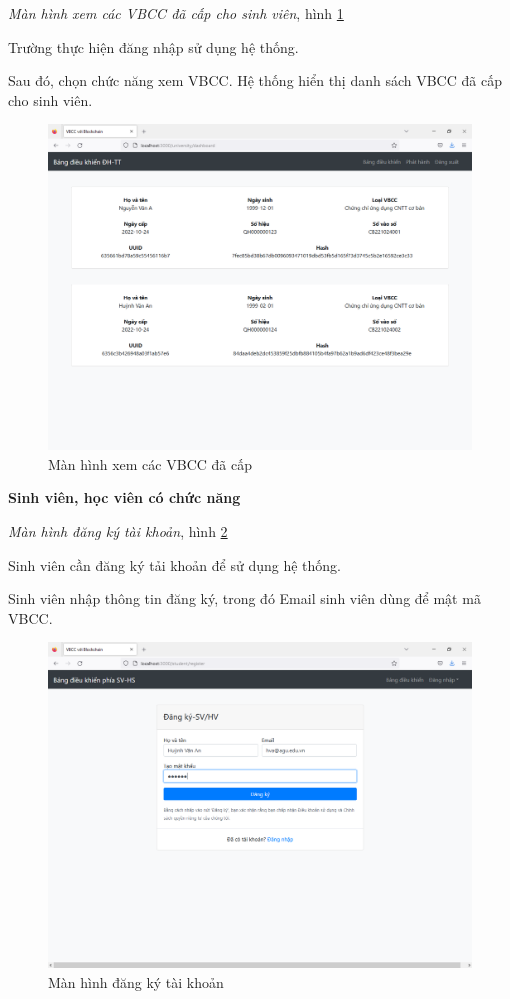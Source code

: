 \emph{Màn hình xem các VBCC đã cấp cho sinh viên}, hình \ref{fig:tt_dacap}

Trường thực hiện đăng nhập sử dụng hệ thống.

Sau đó, chọn chức năng xem VBCC. Hệ thống hiển thị danh sách VBCC đã cấp cho sinh viên.

\begin{figure}[H]
\centering
\includegraphics[width=.9\linewidth]{img/tt_dacap.PNG}
\caption{Màn hình xem các VBCC đã cấp}
\label{fig:tt_dacap}
\end{figure}


\textbf{Sinh viên, học viên có chức năng}

\emph{Màn hình đăng ký tài khoản}, hình \ref{fig:std_new}

Sinh viên cần đăng ký tải khoản để sử dụng hệ thống.

Sinh viên nhập thông tin đăng ký, trong đó Email sinh viên dùng để mật mã VBCC.

\begin{figure}[H]
\centering
\includegraphics[width=.9\linewidth]{img/std_new.PNG}
\caption{Màn hình đăng ký tài khoản}
\label{fig:std_new}
\end{figure}

